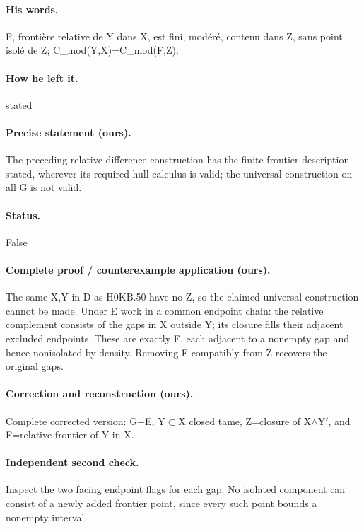\paragraph{His words.} F, frontière relative de Y dans X, est fini, modéré, contenu dans Z, sans point isolé de Z; C\_mod(Y,X)=C\_mod(F,Z).

\paragraph{How he left it.} stated

\paragraph{Precise statement (ours).} The preceding relative-difference construction has the finite-frontier description stated, wherever its required hull calculus is valid; the universal construction on all G is not valid.

\paragraph{Status.} False

\paragraph{Complete proof / counterexample application (ours).} The same X,Y in D as H0KB.50 have no Z, so the claimed universal construction cannot be made. Under E work in a common endpoint chain: the relative complement consists of the gaps in X outside Y; its closure fills their adjacent excluded endpoints. These are exactly F, each adjacent to a nonempty gap and hence nonisolated by density. Removing F compatibly from Z recovers the original gaps.

\paragraph{Correction and reconstruction (ours).} Complete corrected version: G+E, Y\ensuremath{\subset}X closed tame, Z=closure of X\ensuremath{\wedge}Y\ensuremath{\prime}, and F=relative frontier of Y in X.

\paragraph{Independent second check.} Inspect the two facing endpoint flags for each gap. No isolated component can consist of a newly added frontier point, since every such point bounds a nonempty interval.

